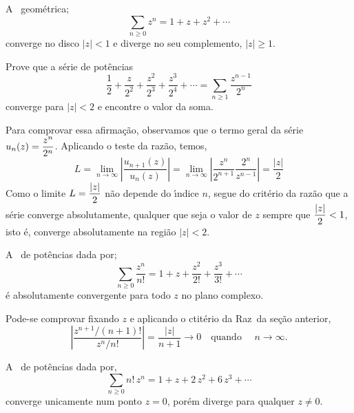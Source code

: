 \begin{exer}
A \ser\ geom\'etrica;
\begin{equation*}
  \sum_{n\geq 0} z^n=1+z+z^2+\cdots
\end{equation*}
converge no disco $|z|<1$ e diverge no seu complemento, $|z|\geq
1$.
\end{exer}

\begin{exer}
Prove que a s\'{e}rie de pot\^{e}ncias
\begin{equation*}
    \frac{1}{2}+\frac{z}{2^2}+\frac{z^2}{2^3}+\frac{z^3}{2^4}+\cdots=\sum_{n\ge 1}\frac{z^{n-1}}{2^n}
\end{equation*}
converge para $|z|<2$ e encontre o valor da soma.
\end{exer}

\solo Para comprovar essa afirma\c{c}\~{a}o, observamos que o termo geral da s\'{e}rie $\displaystyle u_n(z)=\frac{z^n}{2^n}$. Aplicando o teste da raz\~{a}o, temos,
\begin{equation*}
    L=\lim_{n\to \infty}\left|\frac{u_{n+1}(z)}{u_n(z)}\right|=\lim_{n\to \infty}\left|\frac{z^n}{2^{n+1}}\frac{2^n}{z^{n-1}}\right|=\frac{|z|}{2}
\end{equation*}
Como o limite $\displaystyle L=\frac{|z|}{2}$ n\~{a}o depende do \'{\i}ndice $n$, segue do crit\'{e}rio da raz\~{a}o que a s\'{e}rie converge absolutamente, qualquer que seja o valor de $z$ sempre que $\displaystyle \frac{|z|}{2}<1$, isto \'{e}, converge absolutamente na regi\~{a}o $|z|<2$.

\begin{exer}
A \ser\ de pot\^{e}ncias dada por;
\begin{equation*}
  \sum_{n\geq
  0}\frac{z^n}{n!}=1+z+\frac{z^2}{2!}+\frac{z^3}{3!}+\cdots
\end{equation*}
\'e absolutamente convergente para todo $z$ no plano complexo.
\end{exer}

\solo
Pode-se comprovar fixando $z$ e aplicando o ctitério da
Raz\ao\ da se\c{c}\~{a}o anterior,
\begin{equation*}
  \left|\frac{z^{n+1}/(n+1)!}{z^n/n!}\right|=\frac{|z|}{n+1}\to 0\quad\text{
  quando }\quad n \to \infty.
\end{equation*}


\begin{exer}
A \ser\ de pot\^{e}ncias dada por,
\begin{equation*}
  \sum_{n\geq 0}n!\,z^n=1+z+2\,z^2+6\,z^3+\cdots
\end{equation*}
converge unicamente num ponto $z=0$, por\'{e}m diverge para qualquer
$z\neq 0$. 
\end{exer}

